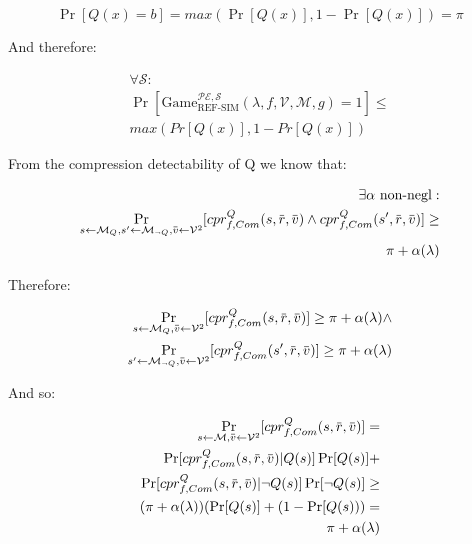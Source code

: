 \documentclass[conference, letterpaper, 10pt]{IEEEtran}
\newcommand{\overbar}[1]{\mkern 1.5mu\overline{\mkern-1.5mu#1\mkern-1.5mu}\mkern 1.5mu}
\begin{document}
\begin{IEEEproof}
\begin{equation*}
    \Pr[Q(x) = b] = max(\Pr[Q(x)], 1 - \Pr[Q(x)]) = \pi
\end{equation*}

And therefore:

\begin{align*}
    \forall \mathcal{S}:\\
    \Pr[
        \text{Game}_{\text{REF-SIM}}^{\mathcal{PE},\mathcal{S}}
        (\lambda, f, \mathcal{V}, \mathcal{M}, g) = 1
    ]
    \leq\\
    max(Pr[Q(x)], 1 - Pr[Q(x)])
\end{align*}

From the compression detectability of Q we know that:

\begin{align*}
    \exists \alpha \text{ non-negl}:\\
    \Pr_{s \leftarrow \mathcal{M}_Q,
         s' \leftarrow \mathcal{M}_{\lnot Q},
         \overbar{v} \leftarrow \mathcal{V}^2}
         [cpr^Q_{f, Com}(s, \overbar{r}, \overbar{v}) \land
          cpr^Q_{f, Com}(s', \overbar{r}, \overbar{v})]
    \geq\\
    \pi + \alpha(\lambda)
\end{align*}

Therefore:

\begin{align*}
    \Pr_{s \leftarrow \mathcal{M}_Q,
         \overbar{v} \leftarrow \mathcal{V}^2}
         [cpr^Q_{f, Com}(s, \overbar{r}, \overbar{v})]
    \geq
    \pi + \alpha(\lambda) \land\\
    \Pr_{s' \leftarrow \mathcal{M}_{\lnot Q},
         \overbar{v} \leftarrow \mathcal{V}^2}
         [cpr^Q_{f, Com}(s', \overbar{r}, \overbar{v})]
    \geq
    \pi + \alpha(\lambda)
\end{align*}

And so:

\begin{align*}
    \Pr_{s \leftarrow \mathcal{M},
         \overbar{v} \leftarrow \mathcal{V}^2}
         [cpr^Q_{f, Com}(s, \overbar{r}, \overbar{v})]
    =\\
    \Pr[cpr^Q_{f, Com}(s, \overbar{r}, \overbar{v})|Q(s)]\Pr[Q(s)]
    +\\
    \Pr[cpr^Q_{f, Com}(s, \overbar{r}, \overbar{v})|\lnot Q(s)]\Pr[\lnot Q(s)]
    \geq\\
    (\pi + \alpha(\lambda))(\Pr[Q(s)] + (1 - \Pr[Q(s)))
    =\\
    \pi + \alpha(\lambda)
\end{align*}


\end{IEEEproof}
\end{document}
